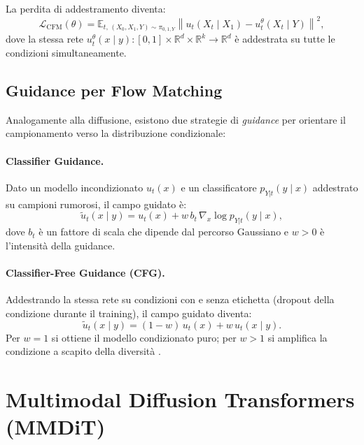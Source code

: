 La perdita di addestramento diventa:
\begin{equation}
  \mathcal{L}_{\mathrm{CFM}}(\theta) =
  \mathbb{E}_{t,\,(X_0, X_1, Y)\sim\pi_{0,1,Y}}\!
  \left\|u_t(X_t \mid X_1) - u_t^\theta(X_t \mid Y)\right\|^2,
\end{equation}
dove la stessa rete $u_t^\theta(x \mid y) : [0,1] \times \mathbb{R}^d \times \mathbb{R}^k \to \mathbb{R}^d$
è addestrata su tutte le condizioni simultaneamente.

\subsection{Guidance per Flow Matching}
\label{subsec:fm-guidance}

Analogamente alla diffusione, esistono due strategie di \emph{guidance}
per orientare il campionamento verso la distribuzione condizionale:

\paragraph{Classifier Guidance.}
Dato un modello incondizionato $u_t(x)$ e un classificatore
$p_{Y|t}(y \mid x)$ addestrato su campioni rumorosi, il campo guidato è:
\begin{equation}
  \tilde{u}_t(x \mid y) = u_t(x) + w\,b_t\,\nabla_x \log p_{Y|t}(y \mid x),
\end{equation}
dove $b_t$ è un fattore di scala che dipende dal percorso Gaussiano e
$w > 0$ è l'intensità della guidance.

\paragraph{Classifier-Free Guidance (CFG).}
Addestrando la stessa rete su condizioni con e senza etichetta
(dropout della condizione durante il training), il campo guidato diventa:
\begin{equation}
  \tilde{u}_t(x \mid y) = (1 - w)\,u_t(x) + w\,u_t(x \mid y).
  \label{eq:fm-cfg}
\end{equation}
Per $w = 1$ si ottiene il modello condizionato puro; per $w > 1$ si
amplifica la condizione a scapito della diversità
\citep{ho2022cfg,bishop2024}.

\section{Multimodal Diffusion Transformers (MMDiT)}
\label{sec:mmdit}

